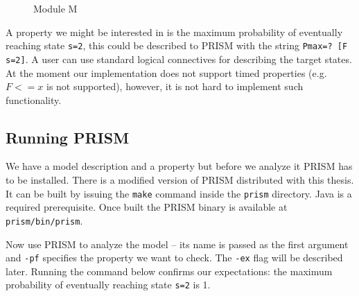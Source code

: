 \begin{figure}
\caption{Module M}
\label{moduleM}
\end{figure}

A property we might be interested in is the maximum probability of
eventually reaching state \verb|s=2|, this could be described to PRISM
with the string \verb|Pmax=? [F s=2]|. A user can use standard logical
connectives for describing the target states. At the moment our
implementation does not support timed properties (e.g. $F <= x$ is not
supported), however, it is not hard to implement such functionality.

\subsection*{Running PRISM}

We have a model description and a property but before we analyze it
PRISM has to be installed.
There is a modified version of PRISM distributed with this thesis. It
can be built by issuing the \verb|make| command inside the
\verb|prism| directory. Java is a required prerequisite.
Once built the PRISM binary is available at \verb|prism/bin/prism|.

Now use PRISM to analyze the model -- its name is passed as the first
argument and \verb|-pf| specifies the property we want to check.
The \verb|-ex| flag will be described later.
Running the command below
confirms our expectations: the maximum probability of eventually
reaching state \verb|s=2| is 1.

